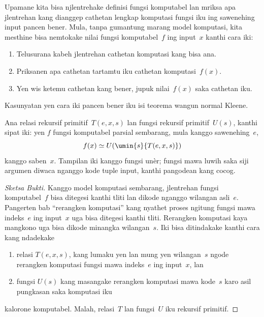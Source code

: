\documentclass[../../../include/open-logic-section]{subfiles}
\begin{document}

Upamane kita bisa njlentrehake definisi fungsi
komputabel lan mriksa apa jlentrehan kang dianggep
cathetan lengkap komputasi fungsi iku ing sawenehing
input pancen bener. Mula, tanpa gumantung marang
model komputasi, kita mesthine bisa nemtokake nilai
fungsi komputabel~$f$ ing input~$x$ kanthi cara iki:
\begin{enumerate}
  \item Telusurana kabeh jlentrehan cathetan
  komputasi kang bisa ana.
  \item Priksanen apa cathetan tartamtu iku cathetan
  komputasi~$f(x)$.
  \item Yen wis ketemu cathetan kang bener, jupuk
  nilai~$f(x)$ saka cathetan iku.
\end{enumerate}
Kasunyatan yen cara iki pancen bener iku isi
teorema wangun normal Kleene.

\begin{thm}
Ana relasi rekursif primitif~$T(e, x, s)$ lan
fungsi rekursif primitif~$U(s)$, kanthi sipat iki:
yen $f$ fungsi komputabel parsial sembarang,
mula kanggo sawenehing~$e$,
\[
f(x) \simeq U(\umin{s}{T(e, x, s)})
\]
kanggo saben~$x$. Tampilan iki kanggo fungsi unèr; fungsi mawa luwih saka siji argumen diwaca nganggo kode tuple input, kanthi pangodean kang cocog.
\end{thm}

\begin{proof}[Sketsa Bukti]
Kanggo model komputasi sembarang, jlentrehan
fungsi komputabel~$f$ bisa ditegesi kanthi tliti
lan dikode nganggo wilangan asli~$e$. Pangerten
bab ``rerangken komputasi'' kang nyathet proses
ngitung fungsi mawa indeks~$e$ ing input~$x$
uga bisa ditegesi kanthi tliti. Rerangken
komputasi kaya mangkono uga bisa dikode
minangka wilangan~$s$. Iki bisa ditindakake
kanthi cara kang ndadekake
\begin{enumerate}
  \item relasi $T(e, x, s)$, kang lumaku yen lan
  mung yen wilangan~$s$ ngode rerangken komputasi
  fungsi mawa indeks~$e$ ing input~$x$, lan
  \item fungsi $U(s)$ kang masangake rerangken
  komputasi mawa kode~$s$ karo asil pungkasan
  saka komputasi iku
\end{enumerate}
kalorone komputabel. Malah, relasi~$T$ lan
fungsi~$U$ iku rekursif primitif.
\end{proof}
\end{document}
